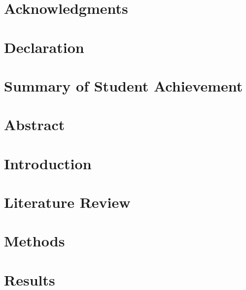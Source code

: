 \documentclass[12pt]{report}
\begin{document}

\restoregeometry

\chapter*{Acknowledgments}

\pagebreak

\chapter*{Declaration}

\pagebreak

\chapter*{Summary of Student Achievement}

\pagebreak

\listoffigures
\listoftables
\pagebreak

\justify

\chapter*{Abstract}

\pagebreak
\printglossaries

\setcounter{tocdepth}{5}
\tableofcontents
\pagebreak

\setcounter{page}{0}
\chapter{Introduction}


\chapter{Literature Review}


\chapter{Methods}


\chapter{Results}\label{chap:results}

\end{document}
